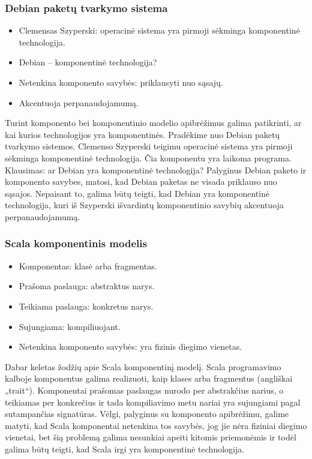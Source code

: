 \begin{frame}
  \frametitle{Debian paketų tvarkymo sistema}
  \begin{itemize}
    \item Clemensas Szyperski: operacinė sistema yra pirmoji sėkminga
      komponentinė technologija.
    \item Debian – komponentinė technologija?
    \item Netenkina komponento savybės: priklausyti nuo sąsajų.
    \item Akcentuoja perpanaudojamumą.
  \end{itemize}
  \begin{handout}
    Turint komponento bei komponentinio modelio apibrėžimus galima
    patikrinti, ar kai kurios technologijos yra komponentinės. Pradėkime
    nuo Debian paketų tvarkymo sistemos. Clemenso Szyperski teigimu
    operacinė sistema yra pirmoji sėkminga komponentinė technologija.
    Čia komponentu yra laikoma programa. Klausimas: ar Debian yra
    komponentinė technologija? Palyginus Debian paketo ir komponento
    savybes, matosi, kad Debian paketas ne visada priklauso nuo sąsajos.
    Nepaisant to, galima būtų teigti, kad Debian yra komponentinė
    technologija, kuri iš Szyperski išvardintų komponentinio savybių
    akcentuoja perpanaudojamumą.
  \end{handout}
\end{frame}

\begin{frame}
  \frametitle{Scala komponentinis modelis}
  \begin{itemize}
    \item Komponentas: klasė arba fragmentas.
    \item Prašoma paslauga: abstraktus narys.
    \item Teikiama paslauga: konkretus narys.
    \item Sujungiama: kompiliuojant.
    \item Netenkina komponento savybės: yra fizinis diegimo vienetas.
  \end{itemize}
  \begin{handout}
    Dabar keletas žodžių apie Scala komponentinį modelį. Scala
    programavimo kalboje komponentus galima realizuoti, kaip klases arba
    fragmentus (angliškai „trait“). Komponentai prašomas paslaugas
    nurodo per abstrakčius narius, o teikiamas per konkrečius ir tada
    kompiliavimo metu nariai yra sujungiami pagal sutampančias
    signatūras. Vėlgi, palyginus su komponento apibrėžimu, galime
    matyti, kad Scala komponentai netenkina tos savybės, jog jie nėra
    fiziniai diegimo vienetai, bet šią problemą galima nesunkiai
    apeiti kitomis priemonėmis ir todėl galima būtų teigti, kad
    Scala irgi yra komponentinė technologija.
  \end{handout}
\end{frame}

